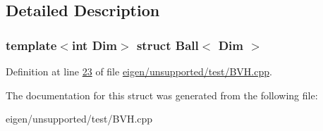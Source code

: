 \subsection{Detailed Description}
\subsubsection*{template$<$int Dim$>$\newline
struct Ball$<$ Dim $>$}



Definition at line \hyperlink{eigen_2unsupported_2test_2_b_v_h_8cpp_source_l00023}{23} of file \hyperlink{eigen_2unsupported_2test_2_b_v_h_8cpp_source}{eigen/unsupported/test/\+B\+V\+H.\+cpp}.



The documentation for this struct was generated from the following file\+:\begin{DoxyCompactItemize}
\item 
eigen/unsupported/test/\+B\+V\+H.\+cpp\end{DoxyCompactItemize}
